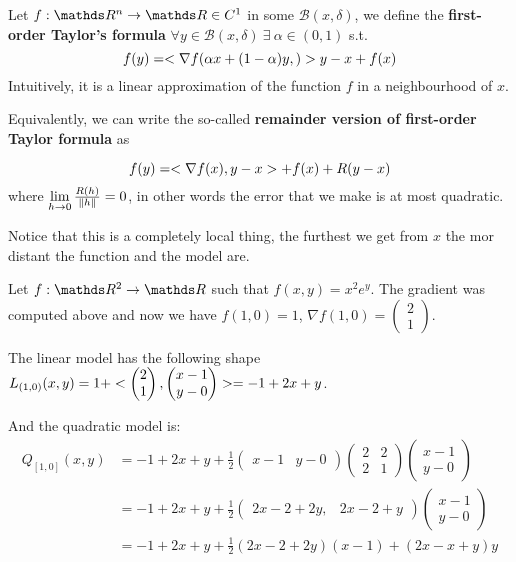\documentclass[ComputationalMathematics.tex]{subfiles}
\begin{document}
\begin{definition}
Let $f : \R^n \to \R \in C^1$ in some $\mathcal{B}(x, \delta)$, we define the \textbf{first-order Taylor's formula}  $\forall y \in \mathcal{B}(x, \delta)~\exists ~ \alpha \in (0, 1)$ s.t.
\[
  f(y) = <\nabla f(\alpha x + (1 - \alpha) y, )> {y - x} + f(x)
\]
Intuitively, it is a linear approximation of the function $f$ in a neighbourhood of $x$. 

  Equivalently, we can write the so-called \textbf{remainder version of first-order Taylor formula} as

\[
  f(y) = <\nabla f(x), y - x> + f(x)+ R(y - x)
\]
  where $\lim\limits_{h \to 0} \frac{R(h)}{\left\lVert h\right\rVert} = 0$, in other words the error that we make is at most quadratic.
\end{definition}

Notice that this is a completely local thing, the furthest we get from $x$ the mor distant the function and the model are.

\begin{example}
Let $f:\R^2 \to \R$ such that $f(x, y) = x^2 e^y$. The gradient was computed above and now we have $f(1, 0) = 1$, $\nabla f(1, 0) = \begin{pmatrix}2\\1\end{pmatrix}$.

The linear model has the following shape $L_{(1, 0)} (x, y) = 1 + <\begin{pmatrix}2\\ 1\end{pmatrix}, \begin{pmatrix} x-1\\ y-0\end{pmatrix}> = -1 + 2x + y$.

And the quadratic model is:
  \begin{equation}
    \begin{split}
      Q_{[1, 0]} (x, y) &= -1 + 2x + y + \frac{1}{2} \begin{pmatrix}x-1 & y-0\end{pmatrix} \begin{pmatrix} 2 & 2\\ 2 & 1 \end{pmatrix} \begin{pmatrix} x-1 \\ y-0 \end{pmatrix}\\ 
      &= -1 +2x + y + \frac{1}{2} \begin{pmatrix} 2x -2 +2y, & 2x -2 +y \end{pmatrix} \begin{pmatrix} x-1\\ y-0\end{pmatrix}\\
      &= -1 + 2x + y + \frac{1}{2} (2x -2 + 2y) (x-1)  + (2x -x +y) y
    \end{split}
    \end{equation}
\end{example}
\end{document}
